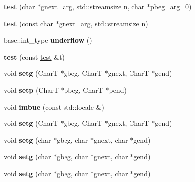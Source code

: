 \begin{DoxyCompactItemize}
\mbox{\label{structtest_aa7a3b5d27789289e3e858b0e77ee11d5}} 
{\bfseries test} (char $\ast$gnext\+\_\+arg, std\+::streamsize n, char $\ast$pbeg\+\_\+arg=0)
\item 
\mbox{\label{structtest_abf34ea6c2d85c399e7cbc02a8d5e4473}} 
{\bfseries test} (const char $\ast$gnext\+\_\+arg, std\+::streamsize n)
\item 
\mbox{\label{structtest_ab361e6ccb64d21972c45d225563f33c8}} 
base\+::int\+\_\+type {\bfseries underflow} ()
\item 
\mbox{\label{structtest_a7d9162e134ad7a6e4521f89e9c87904a}} 
{\bfseries test} (const \mbox{\hyperlink{structtest}{test}} \&t)
\item 
\mbox{\label{structtest_a6e4a956b7c86c4ff3cc80a768ea41215}} 
void {\bfseries setg} (CharT $\ast$gbeg, CharT $\ast$gnext, CharT $\ast$gend)
\item 
\mbox{\label{structtest_a7d348d4742b2946fc916dfd8c7ce9769}} 
void {\bfseries setp} (CharT $\ast$pbeg, CharT $\ast$pend)
\item 
\mbox{\label{structtest_a709340977a71bd73a1fa9df25782d227}} 
void {\bfseries imbue} (const std\+::locale \&)
\item 
\mbox{\label{structtest_a6e4a956b7c86c4ff3cc80a768ea41215}} 
void {\bfseries setg} (CharT $\ast$gbeg, CharT $\ast$gnext, CharT $\ast$gend)
\item 
\mbox{\label{structtest_a5dfe7aaf6d7d82da553ba8f0abfbea97}} 
void {\bfseries setg} (char $\ast$gbeg, char $\ast$gnext, char $\ast$gend)
\item 
\mbox{\label{structtest_a5dfe7aaf6d7d82da553ba8f0abfbea97}} 
void {\bfseries setg} (char $\ast$gbeg, char $\ast$gnext, char $\ast$gend)
\item 
\mbox{\label{structtest_a5dfe7aaf6d7d82da553ba8f0abfbea97}} 
void {\bfseries setg} (char $\ast$gbeg, char $\ast$gnext, char $\ast$gend)
\item 
\mbox{\label{structtest_a5dfe7aaf6d7d82da553ba8f0abfbea97}} 

\end{DoxyCompactItemize}

